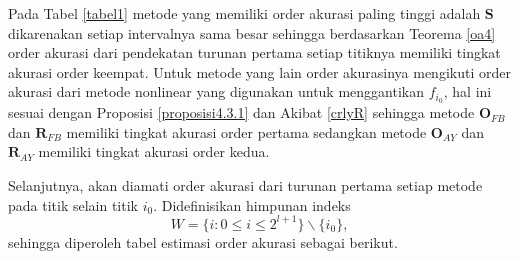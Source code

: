 \begin{table}[htp]
        \centering
        \caption{Tabel estimasi order akurasi eksperimen pertama dengan interval sama besar $h=2^{-l}$, $5 \leq l \leq 8$, $W = \{ i : 0 \leq i \leq 2^{l+1}\}$}
        \label{tabel1}
    \end{table}
    
Pada Tabel \ref{tabel1} metode yang memiliki order akurasi paling tinggi adalah $\textbf{S}$ dikarenakan setiap intervalnya sama besar sehingga berdasarkan Teorema \ref{oa4} order akurasi dari pendekatan turunan pertama setiap titiknya memiliki tingkat akurasi order keempat. Untuk metode yang lain order akurasinya mengikuti order akurasi dari metode nonlinear yang digunakan untuk menggantikan $f_{i_0}$, hal ini sesuai dengan Proposisi \ref{proposisi4.3.1} dan Akibat \ref{crlyR} sehingga metode $\textbf{O}_{FB}$ dan $\textbf{R}_{FB}$ memiliki tingkat akurasi order pertama sedangkan metode $\textbf{O}_{AY}$ dan $\textbf{R}_{AY}$ memiliki tingkat akurasi order kedua.

Selanjutnya, akan diamati order akurasi dari turunan pertama setiap metode pada titik selain titik $i_0$. Didefinisikan himpunan indeks $$W = \{ i : 0 \leq i \leq 2^{l+1} \} \backslash \{i_0\} ,$$ sehingga diperoleh tabel estimasi order akurasi sebagai berikut.

